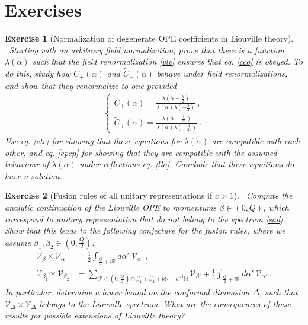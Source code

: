 \documentclass[12pt,a4paper,notitlepage]{report}
\numberwithin{equation}{section}
\theoremstyle{break}
\newtheorem{exo}{Exercise}[chapter]
\begin{document}
\section{Exercises}

\begin{exo}[Normalization of degenerate OPE coefficients in Liouville theory]
 ~\label{exonorm}
Starting with an arbitrary field normalization, prove that there is a function $\lambda(\alpha)$ such that the field renormalization \eqref{vlv} ensures that eq. \eqref{cco} is obeyed.
To do this, study how $C_+(\alpha)$ and $\tilde{C}_+(\alpha)$ behave under field renormalizations, and show that they renormalize to one provided
\begin{align}
\left\{\begin{array}{l} 
 C_+(\alpha) = \frac{\lambda(\alpha-\frac{b}{2})}{\lambda(\alpha)\lambda(-\frac{b}{2})} \ ,
\\
\tilde{C}_+(\alpha) = \frac{\lambda(\alpha-\frac{1}{2b})}{\lambda(\alpha)\lambda(-\frac{1}{2b})} \ .
\end{array}\right. 
\end{align}
Use eq. \eqref{ctc} for showing that these equations for $\lambda(\alpha)$ are compatible with each other, and eq. \eqref{cpcp} for showing that they are compatible with the  assumed behaviour of $\lambda(\alpha)$ under reflections eq. \eqref{llo}.
Conclude that these equations do have a solution.
\end{exo}

\begin{exo}[Fusion rules of all unitary representations if $c>1$]
 ~\label{exoaur}
Compute the analytic continuation of the Liouville OPE to momentums $\beta\in (0,Q)$, which correspond to unitary representation that do not belong to the spectrum \eqref{sad}. 
Show that this leads to the following conjecture for the fusion rules, where we assume $\beta_1,\beta_2\in (0,\frac{Q}{2})$:
\begin{align}
 \mathcal{V}_\beta \times \mathcal{V}_\alpha  
&= \frac12 \int_{\frac{Q}{2}+i\mathbb{R}} d\alpha'\ \mathcal{V}_{\alpha'}\ ,
\\
 \mathcal{V}_{\beta_1} \times \mathcal{V}_{\beta_2} 
&= \sum_{\beta'\in (0,\frac{Q}{2})\cap \beta_1+\beta_2 + b\mathbb{N}+b^{-1}\mathbb{N}} \mathcal{V}_{\beta'}  
+ \frac12 \int_{\frac{Q}{2}+i\mathbb{R}} d\alpha'\ \mathcal{V}_{\alpha'}\ .
\end{align}
In particular, determine a lower bound on the conformal dimension $\Delta$, such that $\mathcal{V}_\Delta \times \mathcal{V}_\Delta$ belongs to the Liouville spectrum.
What are the consequences of these results for possible extensions of Liouville theory?
\end{exo}
\end{document}
